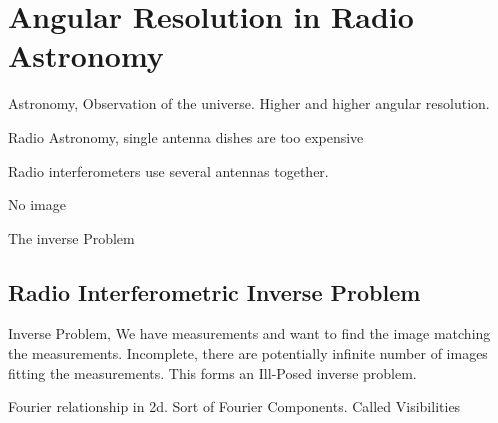 \section{Angular Resolution in Radio Astronomy}\label{intro}
Astronomy, Observation of the universe. Higher and higher angular resolution.

Radio Astronomy, single antenna dishes are too expensive

Radio interferometers use several antennas together.


No image

The inverse Problem



\subsection{Radio Interferometric Inverse Problem}
Inverse Problem, We have measurements and want to find the image matching the measurements. Incomplete, there are potentially infinite number of images fitting the measurements. This forms an Ill-Posed inverse problem. 

Fourier relationship in 2d. Sort of Fourier Components. Called Visibilities

